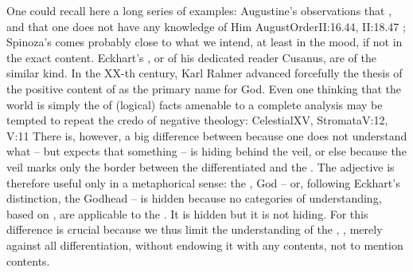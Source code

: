 \pa One could recall here a long series of examples: Augustine's observations
that , and that one does not have any
knowledge of Him \citet{except that which knows that it knows nothing about
  Him}{AugustOrder}{II:16.44, II:18.47 }; Spinoza's
 comes probably close to what we intend, at least in
the mood, if not in the exact content. Eckhart's , or
 of his dedicated reader Cusanus, are of the similar kind.
In the XX-th century, Karl Rahner advanced forcefully the thesis of the positive
content of  as the primary name for God.  Even
one thinking that the world is simply the  of (logical) facts amenable to a
complete analysis may be tempted to repeat the credo of negative theology:
\citet{and the hidden Mysteries which lie beyond our view we have honoured by
  silence}{Celestial}{XV}, \citet{God is invisible and beyond expression by words
  [... We apprehend] not what He is, but what He is not.}{Stromata}{V:12, V:11}
There is, however, a big difference between  because
one does not understand what -- but expects that something -- is hiding behind
the veil, or else because the veil marks only the  border between
the differentiated and the .  The adjective  is
therefore useful only in a metaphorical sense: the , God -- or,
following Eckhart's distinction, the Godhead -- is hidden because no 
categories of understanding, based on , are applicable to the
. It is hidden but it is not hiding. For 
this difference is crucial because we thus limit the understanding of the
, , merely against all differentiation, without
endowing it with any contents, not to mention  contents.



